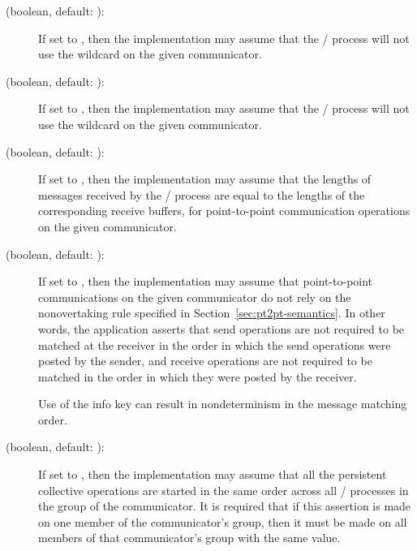 \begin{description}

\item[ (boolean, default: ):]
If set to , then the implementation may assume that the \MPI/ process will not
use the  wildcard on the given communicator.

\item[ (boolean, default: ):]
If set to , then the implementation may assume that the \MPI/ process will not
use the  wildcard on the given communicator.

\item[ (boolean, default: ):]
If set to , then the implementation may assume that the lengths of messages
received by the \MPI/ process are equal to the lengths of the corresponding receive
buffers, for point-to-point communication operations on the given communicator.

\item[ (boolean, default: ):]
If set to , then the implementation may assume that point-to-point
communications on the given communicator do not rely on the nonovertaking rule
specified in Section~\ref{sec:pt2pt-semantics}. In other words, the application
asserts that send operations are not required to be matched at the receiver in
the order in which the send operations were posted by the sender, and
receive operations are not required to be matched in the order in which they
were posted by the receiver.

\begin{users}
Use of the  info key can result in
nondeterminism in the message matching order.
\end{users}

\label{page:comm-info-strict-pcoll-ordering}
\item[ (boolean, default: ):]
If set to , then the implementation may assume that all the persistent collective
operations are started in the same order across all \MPI/ processes in the group of the communicator.
It is required that if this assertion is made on one member of the
communicator's group, then it must be made on all members of that
communicator's group with the same value.


\end{description}
